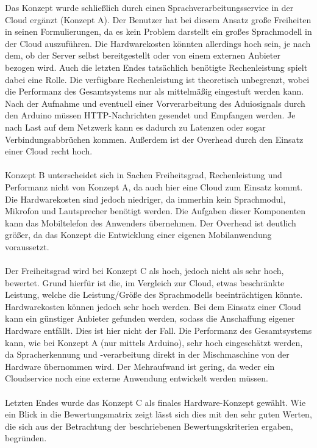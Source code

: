 Das Konzept wurde schließlich durch einen Sprachverarbeitungsservice in der Cloud ergänzt (Konzept A).
Der Benutzer hat bei diesem Ansatz große Freiheiten in seinen Formulierungen, da es kein Problem darstellt ein großes Sprachmodell in der Cloud auszuführen.
Die Hardwarekosten könnten allerdings hoch sein, je nach dem, ob der Server selbst bereitgestellt oder von einem externen Anbieter bezogen wird.
Auch die letzten Endes tatsächlich benötigte Rechenleistung spielt dabei eine Rolle.
Die verfügbare Rechenleistung ist theoretisch unbegrenzt, wobei die Performanz des Gesamtsystems nur als mittelmäßig eingestuft werden kann.
Nach der Aufnahme und eventuell einer Vorverarbeitung des Aduiosignals durch den Arduino müssen \ac{HTTP}-Nachrichten gesendet und Empfangen werden.
Je nach Last auf dem Netzwerk kann es dadurch zu Latenzen oder sogar Verbindungsabbrüchen kommen.
Außerdem ist der Overhead durch den Einsatz einer Cloud recht hoch.\\\\
Konzept B unterscheidet sich in Sachen Freiheitsgrad, Rechenleistung und Performanz nicht von Konzept A, da auch hier eine Cloud zum Einsatz kommt.
Die Hardwarekosten sind jedoch niedriger, da immerhin kein Sprachmodul, Mikrofon und Lautsprecher benötigt werden.
Die Aufgaben dieser Komponenten kann das Mobiltelefon des Anwenders übernehmen.
Der Overhead ist deutlich größer, da das Konzept die Entwicklung einer eigenen Mobilanwendung voraussetzt.\\\\
Der Freiheitsgrad wird bei Konzept C als hoch, jedoch nicht als sehr hoch, bewertet.
Grund hierfür ist die, im Vergleich zur Cloud, etwas beschränkte Leistung, welche die Leistung/Größe des Sprachmodells beeinträchtigen könnte.
Hardwarekosten können jedoch sehr hoch werden.
Bei dem Einsatz einer Cloud kann ein günstiger Anbieter gefunden werden, sodass die Anschaffung eigener Hardware entfällt.
Dies ist hier nicht der Fall.
Die Performanz des Gesamtsystems kann, wie bei Konzept A (nur mittels Arduino), sehr hoch eingeschätzt werden, da Spracherkennung und -verarbeitung direkt in der Mischmaschine von der Hardware übernommen wird.
Der Mehraufwand ist gering, da weder ein Cloudservice noch eine externe Anwendung entwickelt werden müssen.\\\\
Letzten Endes wurde das Konzept C als finales Hardware-Konzept gewählt. Wie ein Blick in die Bewertungsmatrix zeigt lässt sich dies mit den sehr guten Werten, die sich aus der Betrachtung der beschriebenen Bewertungskriterien ergaben, begründen.
